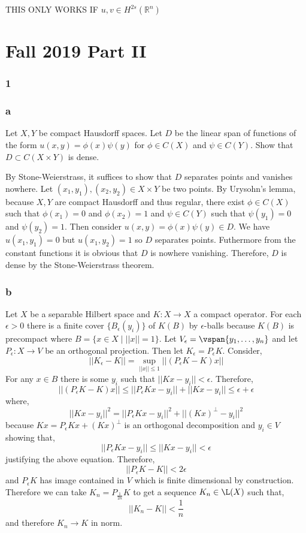 \documentclass[12pt]{article}
\newcommand{\R}{\mathbb{R}}
\begin{document}
THIS ONLY WORKS IF $u,v \in H^{2s}(\R^n)$

\section{Fall 2019 Part II}

\subsubsection{1}

\subsubsection{a}

\begin{exercise}
Let $X,Y$ be compact Hausdorff spaces. Let $D$ be the linear span of functions of the form $u(x,y) = \phi(x) \psi(y)$ for $\phi \in C(X)$ and $\psi \in C(Y)$. Show that $D \subset C(X \times Y)$ is dense.
\end{exercise}

By Stone-Weierstrass, it suffices to show that $D$ separates points and vanishes nowhere. Let $(x_1, y_1), (x_2, y_2) \in X \times Y$ be two points. By Urysohn's lemma, because $X, Y$ are compact Hausdorff and thus regular, there exist $\phi \in C(X)$ such that $\phi(x_1) = 0$ and $\phi(x_2) = 1$ and $\psi \in C(Y)$ such that $\psi(y_1) = 0$ and $\psi(y_2) = 1$. Then consider $u(x,y) = \phi(x) \psi(y) \in D$. We have $u(x_1, y_1) = 0$ but $u(x_1, y_2) = 1$ so $D$ separates points. Futhermore from the constant functions it is obvious that $D$ is nowhere vanishing. Therefore, $D$ is dense by the Stone-Weierstrass theorem.

\subsubsection{b}

Let $X$ be a separable Hilbert space and $K : X \to X$ a compact operator. For each $\epsilon > 0$ there is a finite cover $\{ B_\epsilon(y_i) \}$ of $K(B)$ by $\epsilon$-balls because $K(B)$ is precompact where $B = \{ x \in X \mid || x || = 1 \}$. Let $V_\epsilon = \vspan{y_1, \dots, y_n}$ and let $P_\epsilon : X \to V$ be an orthogonal projection. Then let $K_\epsilon = P_\epsilon K$. Consider,
\[ || K_\epsilon - K || = \sup_{|| x || \le 1} || (P_\epsilon K - K) x || \]
For any $x \in B$ there is some $y_i$ such that $|| K x - y_i || < \epsilon$. Therefore,
\[ || (P_\epsilon K - K) x || \le || P_\epsilon K x - y_i || + || K x - y_i || \le \epsilon + \epsilon \]
where,
\[ || K x - y_i ||^2 = || P_\epsilon K x - y_i ||^2 + || (K x)^\perp - y_i ||^2 \]
because $K x = P_\epsilon K x + (K x)^\perp$ is an orthogonal decomposition and $y_i \in V$ showing that,
\[ || P_\epsilon K x - y_i || \le || K x - y_i || < \epsilon \]
justifying the above equation. Therefore,
\[ || P_\epsilon K - K || < 2 \epsilon \]
and $P_\epsilon K$ has image contained in $V$ which is finite dimensional by construction. Therefore we can take $K_n = P_{\frac{1}{2n}} K$ to get a sequence $K_n \in \L(X)$ such that,
\[ || K_n - K || < \frac{1}{n} \]
and therefore $K_n \to K$ in norm.
\end{document}
